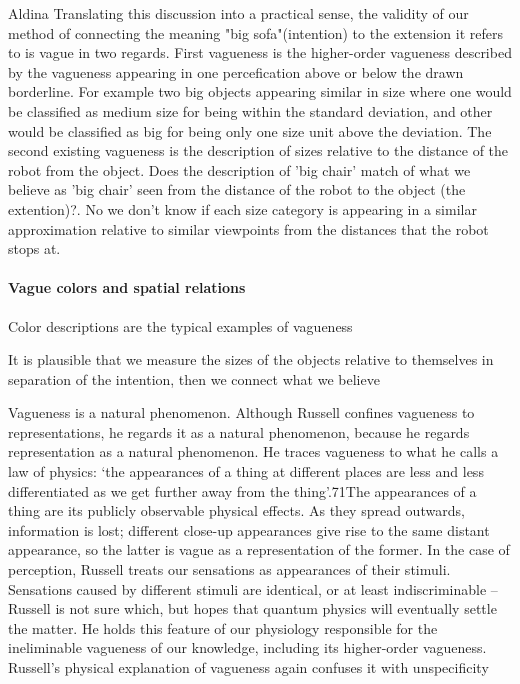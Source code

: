 Aldina 
Translating this discussion into a practical sense, the validity of our method of connecting the meaning "big sofa"(intention) to the extension it refers to is vague in two regards. First vagueness is the higher-order vagueness described by the vagueness appearing in one percefication above or below the drawn borderline. For example two big objects appearing similar in size  where one would be classified as medium size for being within the standard deviation, and other would be classified as big for being only one size unit above the deviation. The second existing vagueness is the description of sizes relative to the distance of the robot from the object. Does the description of 'big chair' match of what we believe as 'big chair' seen from the distance of the robot to the object (the extention)?. No we don't know if each size category is appearing in a similar approximation relative to similar viewpoints from the distances that the robot stops at.


\paragraph{Vague colors and spatial relations}

Color descriptions are the typical examples of vagueness 



It is plausible that we measure the sizes of the objects relative to themselves in separation of the intention, then we connect what we believe

Vagueness is a natural phenomenon. Although Russell confines
vagueness to representations, he regards it as a natural phenomenon,
because he regards representation as a natural phenomenon. He traces
vagueness to what he calls a law of physics: ‘the appearances of a thing at
different places are less and less differentiated as we get further away from
the thing’.71The appearances of a thing are its publicly observable physical
effects. As they spread outwards, information is lost; different close-up
appearances give rise to the same distant appearance, so the latter is vague
as a representation of the former. In the case of perception, Russell treats
our sensations as appearances of their stimuli. Sensations caused by
different stimuli are identical, or at least indiscriminable – Russell is not
sure which, but hopes that quantum physics will eventually settle the
matter. He holds this feature of our physiology responsible for the
ineliminable vagueness of our knowledge, including its higher-order
vagueness.
Russell’s physical explanation of vagueness again confuses it with
unspecificity




